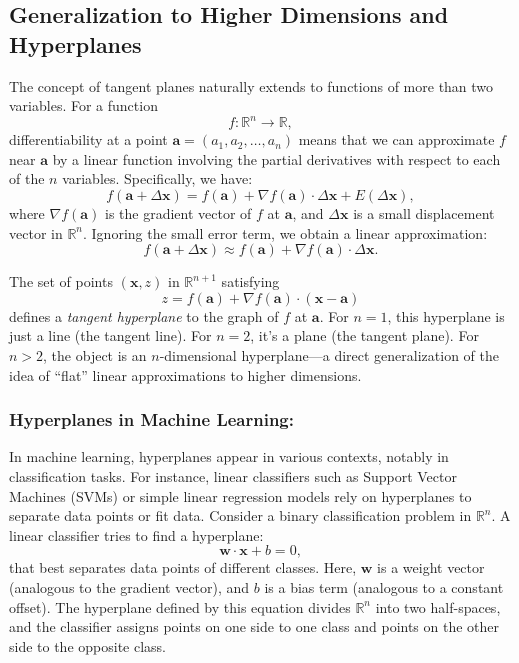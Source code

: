 \subsection*{Generalization to Higher Dimensions and Hyperplanes} 

\noindent The concept of tangent planes naturally extends to functions of more than two variables. For a function
\[
f: \mathbb{R}^n \to \mathbb{R},
\]
differentiability at a point \(\mathbf{a} = (a_1, a_2, \ldots, a_n)\) means that we can approximate \( f \) near \(\mathbf{a}\) by a linear function involving the partial derivatives with respect to each of the \( n \) variables. Specifically, we have:
\[
f(\mathbf{a} + \Delta \mathbf{x}) = f(\mathbf{a}) + \nabla f(\mathbf{a}) \cdot \Delta \mathbf{x} + E(\Delta \mathbf{x}),
\]
where \(\nabla f(\mathbf{a})\) is the gradient vector of \( f \) at \(\mathbf{a}\), and \(\Delta \mathbf{x}\) is a small displacement vector in \(\mathbb{R}^n\). Ignoring the small error term, we obtain a linear approximation:
\[
f(\mathbf{a} + \Delta \mathbf{x}) \approx f(\mathbf{a}) + \nabla f(\mathbf{a}) \cdot \Delta \mathbf{x}.
\]

\noindent The set of points \((\mathbf{x}, z)\) in \(\mathbb{R}^{n+1}\) satisfying
\[
z = f(\mathbf{a}) + \nabla f(\mathbf{a}) \cdot (\mathbf{x}-\mathbf{a})
\]
defines a \textit{tangent hyperplane} to the graph of \( f \) at \(\mathbf{a}\). For \( n=1 \), this hyperplane is just a line (the tangent line). For \( n=2 \), it’s a plane (the tangent plane). For \( n>2 \), the object is an \(n\)-dimensional hyperplane—a direct generalization of the idea of “flat” linear approximations to higher dimensions.

\subsubsection*{Hyperplanes in Machine Learning:}  
In machine learning, hyperplanes appear in various contexts, notably in classification tasks. For instance, linear classifiers such as Support Vector Machines (SVMs) or simple linear regression models rely on hyperplanes to separate data points or fit data. Consider a binary classification problem in \(\mathbb{R}^n\). A linear classifier tries to find a hyperplane:
\[
\mathbf{w} \cdot \mathbf{x} + b = 0,
\]
that best separates data points of different classes. Here, \(\mathbf{w}\) is a weight vector (analogous to the gradient vector), and \( b \) is a bias term (analogous to a constant offset). The hyperplane defined by this equation divides \(\mathbb{R}^n\) into two half-spaces, and the classifier assigns points on one side to one class and points on the other side to the opposite class. \\

